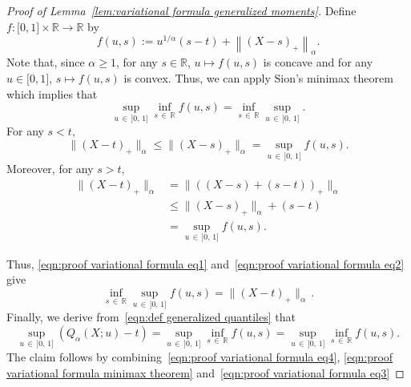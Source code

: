 \documentclass[10pt]{amsart}
\theoremstyle{definition}\newtheorem{defi}[theo]{Definition}\newtheorem{rema}[theo]{Remark}\newtheorem{exam}[theo]{Example}\newtheorem{exem}[theo]{Example}\newtheorem{nota}[theo]{Notation}
\newcommand{\bR}{\mathbb{R}}
\newcommand{\intervalleff}[2]{\mathopen{[} #1\mathclose{}\mathpunct{},#2\mathclose{]}}
\begin{document}
\begin{proof}[Proof of Lemma~\ref{lem:variational formula generalized moments}]
Define $f:\intervalleff 01\times \bR\to\bR$ by
\[
f(u,s):=u^{1/\alpha}(s-t)+\left\|(X-s)_+\right\|_\alpha.
\]
Note that, since $\alpha\geq 1$, for any $s\in\bR$, $u\mapsto f(u,s)$ is concave and for any $u\in\intervalleff 01$, $s\mapsto f(u,s)$ is convex. Thus, we can apply Sion's minimax theorem~\cite{Sion58} which implies that
\begin{equation}\label{eqn:proof variational formula minimax theorem}
\sup_{u\,\in\,]0,\,1]}\inf_{s\,\in\,\bR} f(u,s)=\inf_{s\,\in\,\bR} \sup_{u\,\in\,]0,\,1]}.
\end{equation}
For any $s<t$,
\begin{equation}\label{eqn:proof variational formula eq1}
\|(X-t)_+\|_\alpha\leq\|(X-s)_+\|_\alpha= \sup_{u\,\in\,]0,\,1]} f(u,s).
\end{equation}
Moreover, for any $s>t$,
\begin{equation}\label{eqn:proof variational formula eq2}
\begin{aligned}
\|(X-t)_+\|_\alpha &= \|((X-s)+(s-t))_+\|_\alpha\\
&\leq \|(X-s)_+\|_\alpha +(s-t)\\
&=\sup_{u\,\in\,]0,\,1]} f(u,s).
\end{aligned}
\end{equation}


Thus, \eqref{eqn:proof variational formula eq1} and~\eqref{eqn:proof variational formula eq2} give
\begin{equation}\label{eqn:proof variational formula eq3}
\inf_{s\,\in\,\bR}\sup_{u\,\in\,]0,\,1]} f(u,s)=\|(X-t)_+\|_\alpha\,.
\end{equation}
Finally, we derive from~\eqref{eqn:def generalized quantiles} that
\begin{equation}\label{eqn:proof variational formula eq4}
\sup_{u\,\in\,]0,\,1]}(Q_\alpha(X;u)-t)=\sup_{u\,\in\,]0,\,1]}\inf_{s\,\in\,\bR} f(u,s)=\sup_{u\,\in\,]0,\,1]}\inf_{s\,\in\,\bR} f(u,s).
\end{equation}
The claim follows by combining~\eqref{eqn:proof variational formula eq4}, \eqref{eqn:proof variational formula minimax theorem} and~\eqref{eqn:proof variational formula eq3}
\end{proof}
\end{document}
